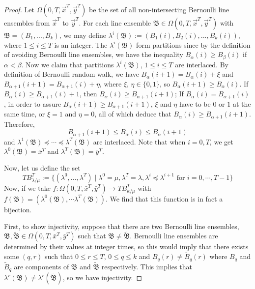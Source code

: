 \begin{proof} Let $\Omega(0,T,\vec{x}^T, \vec{y}^T)$ be the set of all non-intersecting Bernoulli line ensembles from $\vec{x}^T$ to $\vec{y}^T$. For each line ensemble $\mathfrak{B}\in \Omega(0,T,\vec x^T,\vec y^T)$ with $\mathfrak B=(B_1,...,B_k)$, we may define $\lambda^{i}(\mathfrak B):=(B_1(i),B_2(i),...,B_k(i))$, where $1 \leq i\leq T$ is an integer. The $\lambda^{i}(\mathfrak{B})$ form partitions since by the definition of avoiding Bernoulli line ensembles, we have the inequality $B_\alpha(i)\geq B_\beta(i)$ if $\alpha<\beta$. Now we claim that partitions $\lambda^{i}(\mathfrak{B})$, $1\leq i \leq T$ are interlaced. By definition of Bernoulli random walk, we have $B_{\alpha}(i+1)=B_{\alpha}(i)+\xi$ and $B_{\alpha+1}(i+1)=B_{\alpha+1}(i)+\eta$, where $\xi$, $\eta\in\{0,1\}$, so $B_{\alpha}(i+1)\geq B_{\alpha}(i)$. If $B_{\alpha}(i)\geq B_{\alpha+1}(i)+1$, then $B_{\alpha}(i)\geq B_{\alpha+1}(i+1)$; If $B_{\alpha}(i)=B_{\alpha+1}(i)$, in order to assure $B_{\alpha}(i+1)\geq B_{\alpha+1}(i+1)$, $\xi$ and $\eta$ have to be $0$ or $1$ at the same time, or $\xi=1$ and $\eta=0$, all of which deduce that $B_{\alpha}(i)\geq B_{\alpha+1}(i+1)$. Therefore,
\[B_{\alpha+1}(i+1)\leq B_\alpha(i)\leq B_\alpha(i+1)\]
and $\lambda^{1}(\mathfrak{B})\preceq\cdots\preceq\lambda^{T}(\mathfrak{B})$ are interlaced. Note that when $i=0,T$, we get $\lambda^0(\mathfrak{B})=\bar x^T$ and $\lambda^T(\mathfrak{B})=\bar y^T$.

Now, let us define the set 
\[TB_{\lambda/\mu}^T:=\{(\lambda^0,...,\lambda^T)\mid \lambda^0=\mu, \lambda^T=\lambda, \lambda^i\preceq\lambda^{i+1}\text{ for }i=0,\cdots,T-1\}\] 
Now, if we take $f:\Omega(0,T,\bar x^T, \bar y ^T)\to TB_{\kappa/\mu}^T$ with $f(\mathfrak{B})= (\lambda^0(\mathfrak{B}),\cdots \lambda^T(\mathfrak{B}))$. We find that this function is in fact a bijection. 

First, to show injectivity, suppose that there are two Bernoulli line ensembles, $\mathfrak{B}, \widetilde{\mathfrak{B}}\in \Omega(0,T,\bar x^T, \bar y ^T)$ such that $\mathfrak{B}\neq \widetilde{\mathfrak{B}}$.
Bernoulli line ensembles are determined by their values at integer times, so this would imply that there exists some $(q,r)$ such that $0\leq r\leq T$, $0\leq q \leq k$ and $B_q(r)\neq \widetilde{B}_q(r)$ where $B_q$ and $\widetilde{B}_q$ are components of $\mathfrak{B}$ and $\widetilde{\mathfrak{B}}$ respectively. 
This implies that $\lambda^r(\mathfrak B)\neq \lambda^r(\widetilde{\mathfrak{B}})$, so we have injectivity. 


\end{proof}
